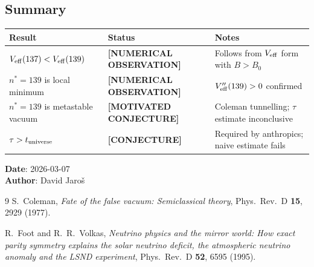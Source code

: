 \documentclass[12pt]{article}
\theoremstyle{definition}
\theoremstyle{remark}
\begin{document}
\subsection{Summary}

\begin{center}
\renewcommand{\arraystretch}{1.3}
\begin{tabular}{lll}
\toprule
\textbf{Result} & \textbf{Status} & \textbf{Notes} \\
\midrule
$V_{\rm eff}(137) < V_{\rm eff}(139)$ & \textbf{[NUMERICAL OBSERVATION]} &
  Follows from $V_{\rm eff}$ form with $B > B_0$ \\
$n^* = 139$ is local minimum & \textbf{[NUMERICAL OBSERVATION]} &
  $V_{\rm eff}''(139) > 0$ confirmed \\
$n^* = 139$ is metastable vacuum & \textbf{[MOTIVATED CONJECTURE]} &
  Coleman tunnelling; $\tau$ estimate inconclusive \\
$\tau > t_{\rm universe}$ & \textbf{[CONJECTURE]} &
  Required by anthropics; naive estimate fails \\
\bottomrule
\end{tabular}
\end{center}

\noindent\textbf{Date}: 2026-03-07 \\
\textbf{Author}: David Jaroš

\begin{thebibliography}{9}
S.\ Coleman, \textit{Fate of the false vacuum: Semiclassical theory},
Phys.\ Rev.\ D \textbf{15}, 2929 (1977).

R.\ Foot and R.\ R.\ Volkas, \textit{Neutrino physics and the mirror world:
How exact parity symmetry explains the solar neutrino deficit, the atmospheric
neutrino anomaly and the LSND experiment},
Phys.\ Rev.\ D \textbf{52}, 6595 (1995).
\end{thebibliography}

\ifdefined\INCLUDEMODE
\else
\end{document}
